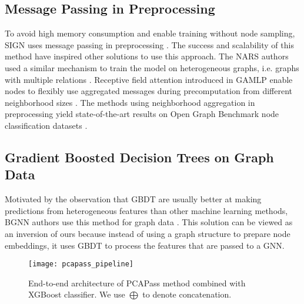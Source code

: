 \documentclass[nohyperref]{article}
\theoremstyle{plain}
\theoremstyle{definition}
\theoremstyle{remark}
\begin{document}
\subsection{Message Passing in Preprocessing}
To avoid high memory consumption and enable training without node sampling, SIGN uses message passing in preprocessing \cite{rossi20sign}. 
The success and scalability of this method have inspired other solutions to use this approach. 
The NARS authors used a similar mechanism to train the model on heterogeneous graphs, i.e. graphs with multiple relations \cite{yu2020scalable}. 
Receptive field attention introduced in GAMLP enable nodes to flexibly use aggregated messages during precomputation from different neighborhood sizes \cite{zhang2021graph}. 
The methods using neighborhood aggregation in preprocessing yield state-of-the-art results on Open Graph Benchmark node classification datasets \cite{hu2021open}.

\subsection{Gradient Boosted Decision Trees on Graph Data}
Motivated by the observation that GBDT are usually better at making predictions from heterogeneous features than other machine learning methods, BGNN authors use this method for graph data \cite{ivanov2021boost}. 
This solution can be viewed as an inversion of ours because instead of using a graph structure to prepare node embeddings, it uses GBDT to process the features that are passed to a GNN. 

\begin{figure}[H]
    \vskip 0.2in
    \begin{center}
    \centerline{\texttt{[image: pcapass\_pipeline]}}
    \caption{End-to-end architecture of PCAPass method combined with XGBoost classifier. We use \textbf{ $\bigoplus$} to denote concatenation.}
    \label{fig:pcapass_pipeline}
    \end{center}
    \vskip -0.2in
\end{figure}
\end{document}
